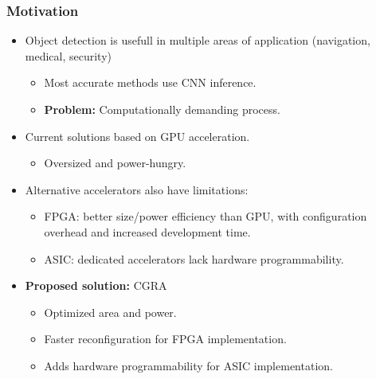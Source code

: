 



\begin{frame}
  \frametitle{Motivation}
  \begin{itemize}
  \item Object detection is usefull in multiple areas of application
    (navigation, medical, security)
    \begin{itemize}
    \item Most accurate methods use CNN inference.
      \item \textbf{Problem:} Computationally demanding process.
    \end{itemize}
  \item Current solutions based on GPU acceleration.
    \begin{itemize}
      \item Oversized and power-hungry.
    \end{itemize}
  \item Alternative accelerators also have limitations:
    \begin{itemize}
    \item FPGA: better size/power efficiency than GPU, with configuration
      overhead and increased development time.
    \item ASIC: dedicated accelerators lack hardware programmability.
    \end{itemize}
  \item \textbf{Proposed solution:} CGRA
    \begin{itemize}
    \item Optimized area and power.
    \item Faster reconfiguration for FPGA implementation.
      \item Adds hardware programmability for ASIC implementation.
    \end{itemize}
  \end{itemize}
\end{frame}

